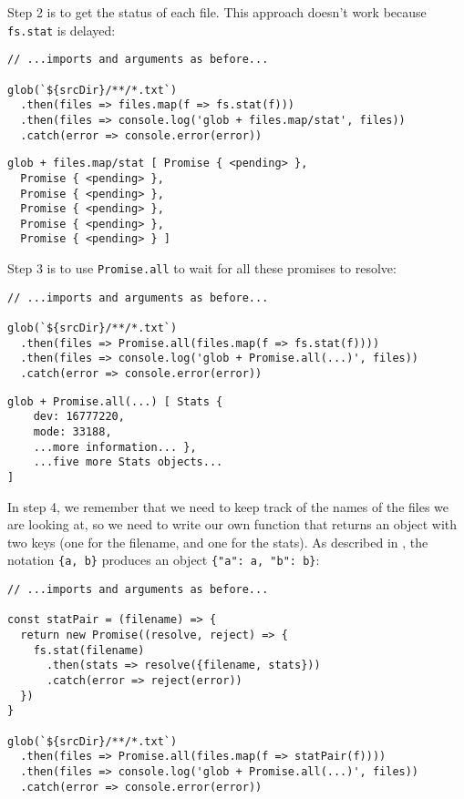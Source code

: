 Step 2 is to get the status of each file.
This approach doesn't work because \texttt{fs.stat} is delayed:

\begin{verbatim}
// ...imports and arguments as before...

glob(`${srcDir}/**/*.txt`)
  .then(files => files.map(f => fs.stat(f)))
  .then(files => console.log('glob + files.map/stat', files))
  .catch(error => console.error(error))
\end{verbatim}

\begin{verbatim}
glob + files.map/stat [ Promise { <pending> },
  Promise { <pending> },
  Promise { <pending> },
  Promise { <pending> },
  Promise { <pending> },
  Promise { <pending> } ]
\end{verbatim}

Step 3 is to use \texttt{Promise.all} to wait for all these promises to resolve:

\begin{verbatim}
// ...imports and arguments as before...

glob(`${srcDir}/**/*.txt`)
  .then(files => Promise.all(files.map(f => fs.stat(f))))
  .then(files => console.log('glob + Promise.all(...)', files))
  .catch(error => console.error(error))
\end{verbatim}

\begin{verbatim}
glob + Promise.all(...) [ Stats {
    dev: 16777220,
    mode: 33188,
    ...more information... },
    ...five more Stats objects...
]
\end{verbatim}

In step 4,
we remember that we need to keep track of the names of the files we are looking at,
so we need to write our own function that returns an object with two keys
(one for the filename, and one for the stats).
As described in ,
the notation \texttt{\{a,\ b\}} produces an object \texttt{\{"a":\ a,\ "b":\ b\}}:

\begin{verbatim}
// ...imports and arguments as before...

const statPair = (filename) => {
  return new Promise((resolve, reject) => {
    fs.stat(filename)
      .then(stats => resolve({filename, stats}))
      .catch(error => reject(error))
  })
}

glob(`${srcDir}/**/*.txt`)
  .then(files => Promise.all(files.map(f => statPair(f))))
  .then(files => console.log('glob + Promise.all(...)', files))
  .catch(error => console.error(error))
\end{verbatim}

